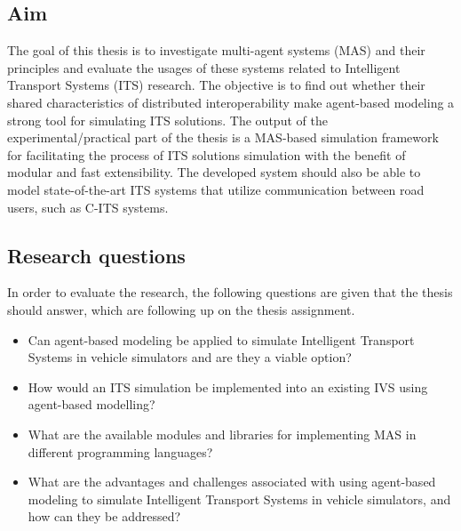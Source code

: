 \documentclass[titlepage, 12pt]{article}
\begin{document}
\subsection{Aim}

The goal of this thesis is to investigate multi-agent systems (MAS) and their principles and
evaluate the usages of these systems related to Intelligent Transport Systems (ITS) research.
The objective is to find out whether their shared characteristics of distributed interoperability make agent-based modeling a
strong tool for simulating ITS solutions. The output of the experimental/practical part of the
thesis is a MAS-based simulation framework for facilitating the process of ITS solutions
simulation with the benefit of modular and fast extensibility. The developed system should
also be able to model state-of-the-art ITS systems that utilize communication between road
users, such as C-ITS systems. 

 \subsection{Research questions}

In order to evaluate the research, the following questions are given that the thesis should
answer, which are following up on the thesis assignment. 


\begin{itemize}
    \item Can agent-based modeling be applied to simulate Intelligent Transport Systems in vehicle simulators and are they a viable option?
    \item How would an ITS simulation be implemented into an existing IVS using agent-based modelling?
    \item What are the available modules and libraries for implementing MAS in different programming languages?
    \item What are the advantages and challenges associated with using agent-based modeling to simulate Intelligent Transport Systems in vehicle simulators, and how can they be addressed?
\end{itemize}
\end{document}
